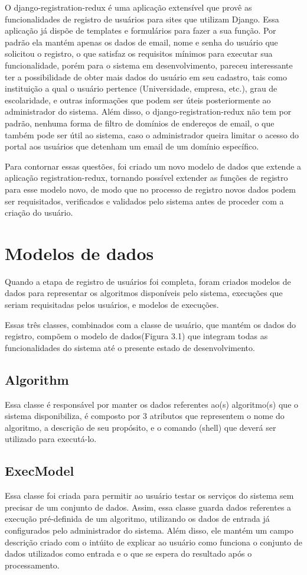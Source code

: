 \documentclass[tg]{mdtufsm}
\begin{document}
O django-registration-redux é uma aplicação extensível que provê as funcionalidades de registro de usuários para sites que utilizam Django. Essa aplicação já dispõe de templates e formulários para fazer a sua função. Por padrão ela mantém apenas os dados de email, nome e senha do usuário que solicitou o registro, o que satisfaz os requisitos mínimos para executar sua funcionalidade, porém para o sistema em desenvolvimento, pareceu interessante ter a possibilidade de obter mais dados do usuário em seu cadastro, tais como instituição a qual o usuário pertence (Universidade, empresa, etc.), grau de escolaridade, e outras informações que podem ser úteis posteriormente ao administrador do sistema.
Além disso, o django-registration-redux não tem por padrão, nenhuma forma de filtro de domínios de endereços de email, o que também pode ser útil ao sistema, caso o administrador queira limitar o acesso do portal aos usuários que detenham um email de um domínio específico.

Para contornar essas questões, foi criado um novo modelo de dados que extende a aplicação registration-redux, tornando possível extender as funções de registro para esse modelo novo, de modo que no processo de registro novos dados podem ser requisitados, verificados e validados pelo sistema antes de proceder com a criação do usuário.

\section{Modelos de dados}
Quando a etapa de registro de usuários foi completa, foram criados modelos de dados para representar os algoritmos disponíveis pelo sistema, execuções que seriam requisitadas pelos usuários, e modelos de execuções.

Essas três classes, combinados com a classe de usuário, que mantém os dados do registro, compõem o modelo de dados(Figura 3.1) que integram todas as funcionalidades do sistema até o presente estado de desenvolvimento.

\subsection{Algorithm}
Essa classe é responsável por manter os dados referentes ao(s) algoritmo(s) que o sistema disponibiliza, é composto por 3 atributos que representem o nome do algoritmo, a descrição de seu propósito, e o comando (shell) que deverá ser utilizado para executá-lo.

\subsection{ExecModel}
Essa classe foi criada para permitir ao usuário testar os serviços do sistema sem precisar de um conjunto de dados. Assim, essa classe guarda dados referentes a execução pré-definida de um algoritmo, utilizando os dados de entrada já configurados pelo administrador do sistema. Além disso, ele mantém um campo descrição criado com o intúito de explicar ao usuário como funciona o conjunto de dados utilizados como entrada e o que se espera do resultado após o processamento.
\end{document}
